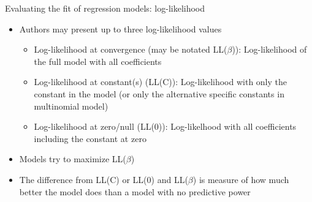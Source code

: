 \begin{frame}{Evaluating the fit of regression models: log-likelihood}
  \begin{itemize}
    \item Authors may present up to three log-likelihood values
    \begin{itemize}
      \item Log-likelihood at convergence (may be notated LL($\beta$)): Log-likelihood of the full model with all coefficients
      \item Log-likelihood at constant(s) (LL(C)): Log-likelihood with only the constant in the model (or only the alternative specific constants in multinomial model)
      \item Log-likelihood at zero/null (LL(0)): Log-likelhood with all coefficients including the constant at zero
    \end{itemize}
    \item Models try to maximize LL($\beta$)
    \item The difference from LL(C) or LL(0) and LL($\beta$) is measure of how much better the model does than a model with no predictive power
  \end{itemize}
\end{frame}

